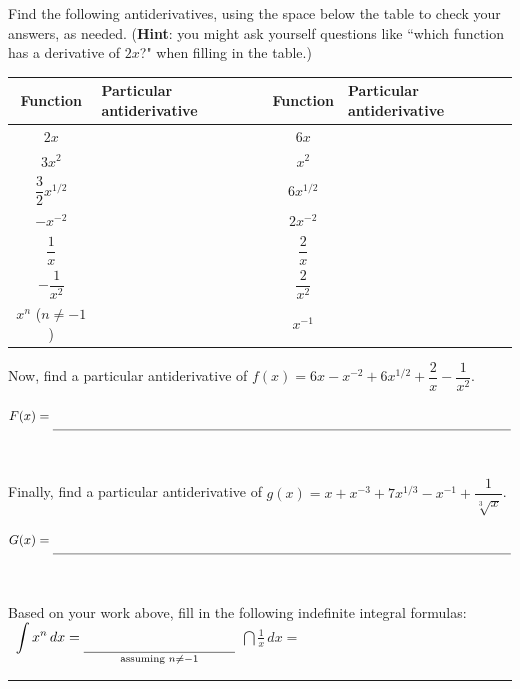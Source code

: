 \documentclass[10pt]{article}
\begin{document}
{} Find the following antiderivatives, using the space below the table to check your answers, as needed. ({\bf Hint}: you might ask yourself questions like ``which function has a derivative of $2x$?" when filling in the table.)

\renewcommand{\arraystretch}{2}

\begin{center}
    \begin{tabular}{ | c | m{2.5in} || c | m{2.5in} | }
    \hline
    Function & Particular antiderivative & Function & Particular antiderivative\\
    \hline
    $2x$ & & $6x$ & \\
    \hline
    $3x^2$ & & $x^2$ & \\
    \hline
    $\dfrac32x^{1/2}$ & & $6x^{1/2}$ & \\
    \hline
    $-x^{-2}$ & & $2x^{-2}$ & \\
    \hline
    $\dfrac1x$ & & $\dfrac{2}{x}$ & \\
    \hline
    $-\dfrac1{x^2}$ & & $\dfrac2{x^2}$ & \\
    \hline
    $x^n$ ($n\not=-1$) & & $x^{-1}$ & \\
    \hline
    \end{tabular}
\end{center}

\vfill

Now, find a particular antiderivative of $f(x)=6x-x^{-2}+6x^{1/2}+\dfrac2x-\dfrac1{x^2}$.\\

\begin{center}
$F(x) = \rule[-8pt]{5in}{0.4pt}$
\end{center}

\

Finally, find a particular antiderivative of $g(x) = x + x^{-3} + 7x^{1/3} - x^{-1} + \dfrac{1}{\sqrt[3]{x}}$.\\

\begin{center}
$G(x) = \rule[-8pt]{5in}{0.4pt}$
\end{center}

\

Based on your work above, fill in the following indefinite integral formulas:\\

\,\hfill
$\dint x^n\,dx = \underset{\text{assuming }n\not=-1}{\rule[-8pt]{1.5in}{0.4pt}}$
\hfill
$\dint \frac1x\,dx = $\rule[-8pt]{1.5in}{0.4pt}
\hfill\,
\end{document}

